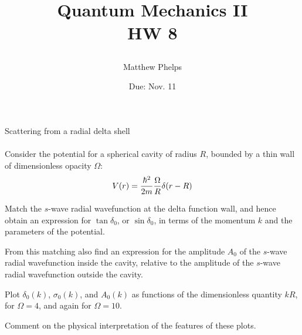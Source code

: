 \documentclass[10pt,letterpaper]{article}
\title{\begin{spacing}{1.2}Quantum Mechanics II\\HW 8\end{spacing}}
\author{Matthew Phelps}
\date{Due: Nov. 11}
\begin{document}
\maketitle

\benum
  	\item{Scattering from a radial delta shell}
	\\ \\
	Consider the potential for a spherical cavity of radius $R$, bounded by a thin wall of dimensionless opacity 
	$\Omega$:
	\[
		V(r) = \frac{\hbar^2}{2m}\frac{\Omega}{R}\delta(r-R)
	\]
	\benum
	\item
	Match the $s$-wave radial wavefunction at the delta function wall, and hence obtain an expression for 
	$\tan\delta_0$, or $\sin\delta_0$, in terms of the momentum $k$ and the parameters of the potential.
	\item
	From this matching also find an expression for the amplitude $A_0$ of the $s$-wave radial wavefunction
	inside the cavity, relative to the amplitude of the $s$-wave radial wavefunction outside the cavity.
	\item
	Plot $\delta_0(k)$, $\sigma_0(k)$, and $A_0(k)$ as functions of the dimensionless quantity $kR$, for 
	$\Omega = 4$, and again for $\Omega=10$.
	\item
	Comment on the physical interpretation of the features of these plots.
	\\
	\\
	\eenum
\end{document}
